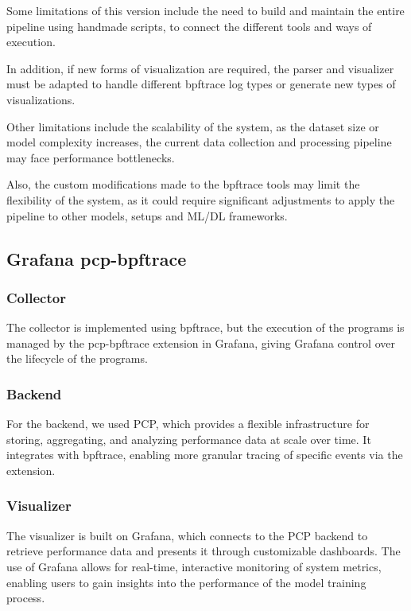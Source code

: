 \documentclass[conference]{IEEEtran}
\begin{document}
Some limitations of this version include the need to build and maintain the entire pipeline using handmade scripts, to connect the different tools and ways of execution.

In addition, if new forms of visualization are required, the parser and visualizer must be adapted to handle different bpftrace log types or generate new types of visualizations.

Other limitations include the scalability of the system, as the dataset size or model complexity increases, the current data collection and processing pipeline may face performance bottlenecks.

Also, the custom modifications made to the bpftrace tools may limit the flexibility of the system, as it could require significant adjustments to apply the pipeline to other models, setups and ML/DL frameworks.

\subsection{Grafana pcp-bpftrace}

\subsubsection{Collector}

The collector is implemented using bpftrace, but the execution of the programs is managed by the pcp-bpftrace extension in Grafana, giving Grafana control over the lifecycle of the programs.

\subsubsection{Backend}

For the backend, we used PCP, which provides a flexible infrastructure for storing, aggregating, and analyzing performance data at scale over time.
It integrates with bpftrace, enabling more granular tracing of specific events via the extension.

\subsubsection{Visualizer}

The visualizer is built on Grafana, which connects to the PCP backend to retrieve performance data and presents it through customizable dashboards.
The use of Grafana allows for real-time, interactive monitoring of system metrics, enabling users to gain insights into the performance of the model training process.
\end{document}
